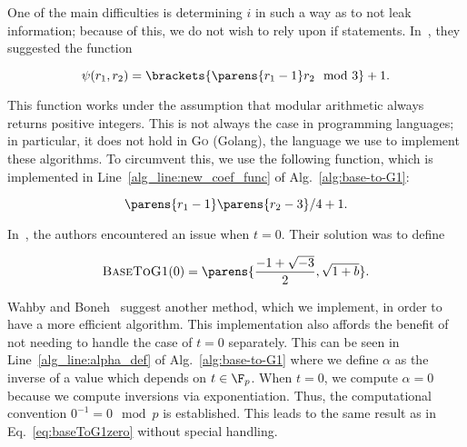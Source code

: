 One of the main difficulties is determining $i$ in such a way
as to not leak information; because of this, we do not wish to
rely upon if statements.
In~\cite{ft2012bnhashtocurve}, they suggested the function

\begin{equation}
    \psi(r_{1},r_{2}) = \brackets{\parens{r_{1}-1}r_{2}\mod3} + 1.
    \label{eq:ftAB}
\end{equation}

\noindent
This function works under the assumption that modular
arithmetic always returns positive integers.
This is not always the case in programming languages;
in particular, it does not hold in \textsc{Go} (Golang), the language
we use to implement these algorithms.
To circumvent this, we use the following function,
which is implemented in Line~\ref{alg_line:new_coef_func}
of Alg.~\ref{alg:base-to-G1}:

\begin{equation}
    \parens{r_{1}-1}\parens{r_{2}-3}/4 + 1.
    \label{eq:newAB}
\end{equation}

In~\cite{ft2012bnhashtocurve}, the authors encountered an issue when $t=0$.
Their solution was to define

\begin{equation}
    \textsc{BaseToG1}(0) = \parens{\frac{-1+\sqrt{-3}}{2}, \sqrt{1+b}}.
    \label{eq:baseToG1zero}
\end{equation}

\noindent
Wahby and Boneh~\cite{boneh2019h2cBLS12} suggest another
method, which we implement, in order to have a more efficient
algorithm.
This implementation also affords the benefit of not needing to
handle the case of $t=0$ separately.
This can be seen in Line~\ref{alg_line:alpha_def}
of Alg.~\ref{alg:base-to-G1} where we define $\alpha$ as the inverse
of a value which depends on $t\in\F_{p}$.
When $t=0$, we compute $\alpha = 0$
because we compute inversions via exponentiation.
Thus, the computational convention $0^{-1} = 0 \mod p$ is established.
This leads to the same result as in Eq.~\eqref{eq:baseToG1zero}
without special handling.

